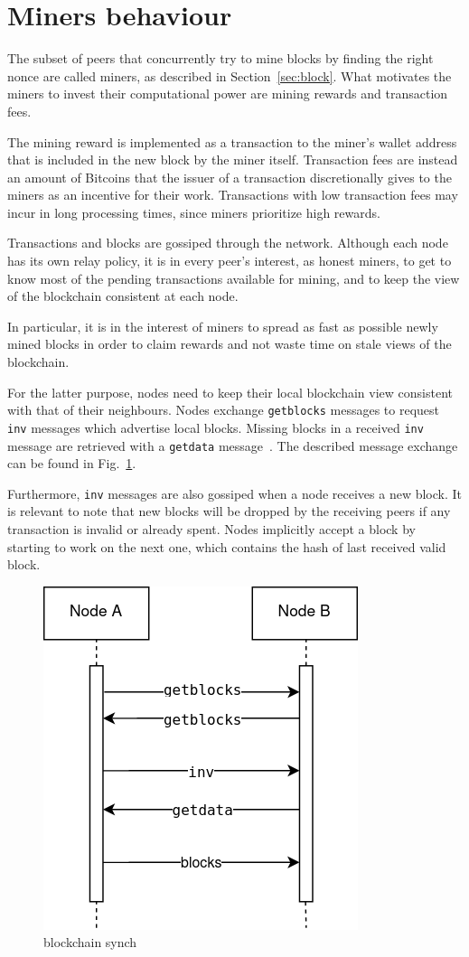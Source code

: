 \section{Miners behaviour}\label{sec:miners}
The subset of peers that concurrently try to mine blocks by finding the right nonce are called miners, as described in Section~\ref{sec:block}. What motivates the miners to invest their computational power are mining rewards and transaction fees.

The mining reward is implemented as a transaction to the miner's wallet address that is included in the new block by the miner itself. Transaction fees are instead an amount of Bitcoins that the issuer of a transaction discretionally gives to the miners as an incentive for their work. Transactions with low transaction fees may incur in long processing times, since miners prioritize high rewards.\par

Transactions and blocks are gossiped through the network. Although each node has its own relay policy, it is in every peer's interest, as honest miners, to get to know most of the pending transactions available for mining, and to keep the view of the blockchain consistent at each node.

In particular, it is in the interest of miners to spread as fast as possible newly mined blocks in order to claim rewards and not waste time on stale views of the blockchain.

For the latter purpose, nodes need to keep their local blockchain view consistent with that of their neighbours. Nodes exchange \texttt{getblocks} messages to request \texttt{inv} messages which advertise local blocks. Missing blocks in a received \texttt{inv} message are retrieved with a \texttt{getdata} message~\cite{protocoldoc}. The described message exchange can be found in Fig.~\ref{fig:synch}.

Furthermore, \texttt{inv} messages are also gossiped when a node receives a new block. It is relevant to note that new blocks will be dropped by the receiving peers if any transaction is invalid or already spent. Nodes implicitly accept a block by starting to work on the next one, which contains the hash of last received valid block. 

\begin{figure}[h]
	\includegraphics[width=.35\textwidth]{pict/blockchain-synch.png}
	\centering
	\caption{blockchain synch}
	\label{fig:synch}
\end{figure}

